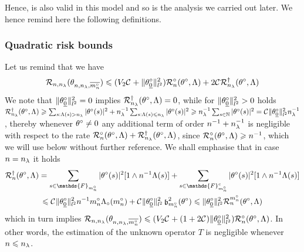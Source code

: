 Hence,  is also valid in this model and so is the analysis we carried out later.
We hence remind here the following definitions.
\subsubsection{Quadratic risk bounds}
Let us remind that we have
\begin{equation*}
\mathcal{R}_{n, n_{\lambda}}(\theta_{n, n_{\lambda}, \overline{m_{n}^{\circ}}}) \leq (V_{2} \cst{} + \Vert \theta^{\circ}_{\underline{0}} \Vert_{l^{2}}^{2})\mathcal{R}_{n}^{\circ}(\theta^{\circ}, \Lambda) + 2 \cst{} \mathcal{R}_{n_{\lambda}}^{\dagger}(\theta^{\circ}, \Lambda)
\end{equation*}
We note that $\Vnormlp{\xdf_{\underline{0}}}^2=0$ implies
  $\mRa{\xdf,\Lambda}=0$, while for $\Vnormlp{\xdf_{\underline{0}}}^2>0$ holds
  $\mRa{\xdf,\Lambda}\geq \sum_{s:\iSv[s]>\ssE} \vert \fxdf[(s)] \vert ^2+\ssE^{-1}\sum_{s:\iSv[s]\leq\ssE} \vert \fxdf[(s)] \vert ^2  \geq\ssE^{-1}\sum_{s\in\Nz} \vert \fxdf[(s)] \vert ^2=\cst{}\Vnormlp{\xdf_{\underline{0}}}^2
  \ssE^{-1}$, thereby whenever $\xdf\ne 0$
  any additional term of order $\ssY^{-1}+\ssE^{-1}$
  is negligible with respect to the rate
  $\oRa{\xdf,\Lambda}+\mRa{\xdf,\Lambda}$, since
  $\oRa{\xdf,\Lambda}\geq \ssY^{-1}$, 
  which we will use below without further reference. We shall
  emphasise that in case $\ssY=\ssE$ it holds
  \begin{multline}
    \mRa[\ssY]{\xdf,\Lambda}=\sum_{s\in \mathds{F}_{m_{n}^{\circ}}} \vert \fxdf[(s)] \vert^2 [1 \wedge \ssY^{-1}\iSv[s]]
    + \sum_{s\in \mathds{F}_{m_{n}^{\circ}}^{c}} \vert \fxdf[(s)] \vert ^2[1\wedge\ssY^{-1}\iSv[s]]\\
    \leq \cst{}\Vnormlp{\xdf_{\underline{0}}}^2 \ssY^{-1} \oDi{\ssY}
    \oiSv[\oDi{\ssY}] +
    \cst{}\Vnormlp{\xdf_{\underline{0}}}^2\bias[\oDi{\ssY}]^2(\theta^{\circ})\leq
    \Vnormlp{\xdf_{\underline{0}}}^2\dRa{\oDi{\ssY}}{\xdf,\Lambda}
  \end{multline}
  which in turn implies $\mathcal{R}_{n, n_{\lambda}}(\theta_{n, n_{\lambda}, \overline{m_{n}^{\circ}}}) \leq (V_{2} \cst{} + (1 + 2 \cst{})\Vert \theta^{\circ}_{\underline{0}} \Vert_{l^{2}}^{2})\mathcal{R}_{n}^{\circ}(\theta^{\circ}, \Lambda)$.
  In other words, the estimation of the unknown operator $T$ is negligible whenever $\ssY\leq\ssE$.

